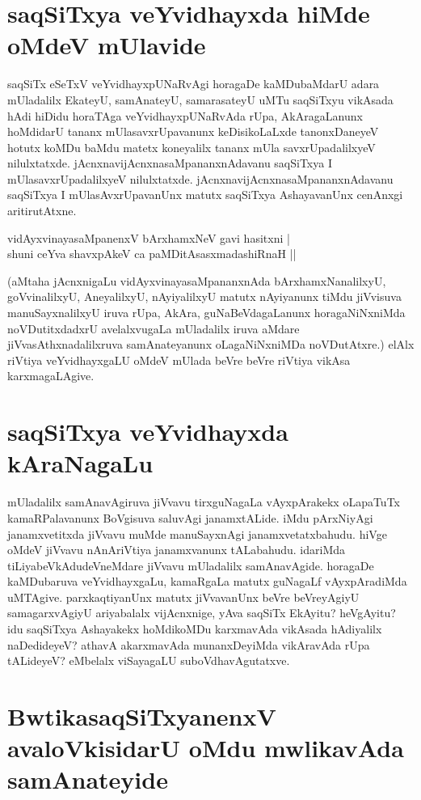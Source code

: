 \section*{saqSiTxya veYvidhayxda hiMde oMdeV mUlavide}

saqSiTx eSeTxV veYvidhayxpUNaRvAgi horagaDe kaMDubaMdarU adara mUladalilx EkateyU, samAnateyU, samarasateyU uMTu saqSiTxyu vikAsada hAdi hiDidu horaTAga veYvidhayxpUNaRvAda rUpa, AkAragaLanunx hoMdidarU tananx mUlasavxrUpavanunx keDisikoLaLxde tanonxDaneyeV hotutx koMDu baMdu matetx koneyalilx tananx mUla savxrUpadalilxyeV nilulxtatxde. jAcnxnavijAcnxnasaMpananxnAdavanu saqSiTxya I mUlasavxrUpadalilxyeV nilulxtatxde. jAcnxnavijAcnxnasaMpananxnAdavanu saqSiTxya I mUlasAvxrUpavanUnx matutx saqSiTxya AshayavanUnx cenAnxgi aritirutAtxne.

\begin{shloka}
vidAyxvinayasaMpanenxV bArxhamxNeV gavi hasitxni |\label{67}\\
shuni ceYva shavxpAkeV ca paMDitAsasxmadashiRnaH ||
\end{shloka}

(aMtaha jAcnxnigaLu vidAyxvinayasaMpananxnAda bArxhamxNanalilxyU, goVvinalilxyU, AneyalilxyU, nAyiyalilxyU matutx nAyiyanunx tiMdu jiVvisuva manuSayxnalilxyU iruva rUpa, AkAra, guNaBeVdagaLanunx horagaNiNxniMda noVDutitxdadxrU avelalxvugaLa mUladalilx iruva aMdare jiVvasAthxnadalilxruva samAnateyanunx oLagaNiNxniMDa noVDutAtxre.) elAlx riVtiya veYvidhayxgaLU oMdeV mUlada beVre beVre riVtiya vikAsa karxmagaLAgive.

\section*{saqSiTxya veYvidhayxda kAraNagaLu}

mUladalilx samAnavAgiruva jiVvavu tirxguNagaLa vAyxpArakekx oLapaTuTx kamaRPalavanunx BoVgisuva saluvAgi janamxtALide. iMdu pArxNiyAgi janamxvetitxda jiVvavu muMde manuSayxnAgi janamxvetatxbahudu. hiVge oMdeV jiVvavu nAnAriVtiya janamxvanunx tALabahudu. idariMda tiLiyabeVkAdudeVneMdare jiVvavu mUladalilx samAnavAgide. horagaDe kaMDubaruva veYvidhayxgaLu, kamaRgaLa matutx guNagaLf vAyxpAradiMda uMTAgive. parxkaqtiyanUnx matutx jiVvavanUnx beVre beVreyAgiyU samagarxvAgiyU ariyabalalx vijAcnxnige, yAva saqSiTx EkAyitu? heVgAyitu? idu saqSiTxya Ashayakekx hoMdikoMDu karxmavAda vikAsada hAdiyalilx naDedideyeV? athavA akarxmavAda munanxDeyiMda vikAravAda rUpa tALideyeV? eMbelalx viSayagaLU suboVdhavAgutatxve.

\section*{BwtikasaqSiTxyanenxV avaloVkisidarU oMdu mwlikavAda samAnateyide}

